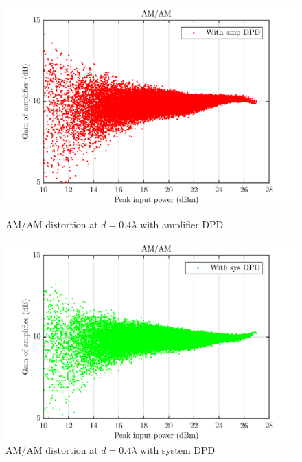 \begin{figure}[H]
  \centering
  \begin{minipage}[b]{0.5\textwidth}
	\includegraphics[scale = 0.5]{figures/measurement/cree/meas3/amam_amp_dpd_0p4.png}
	\caption{AM/AM distortion at $d = 0.4\lambda$ with amplifier DPD}	
    \label{fig:meas4_amam7}
  \end{minipage}
  \hfill
  \begin{minipage}[b]{0.4\textwidth}
	\includegraphics[scale = 0.5]{figures/measurement/cree/meas3/amam_sys_dpd_0p4.png}
	\caption{AM/AM distortion at $d = 0.4\lambda$ with system DPD}
    \label{fig:meas4_amam8}
  \end{minipage}
\end{figure}

